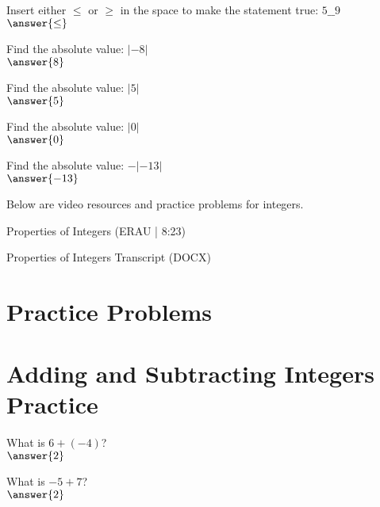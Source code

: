 \documentclass{ximera}
\begin{document}
\begin{problem}
Insert either $\leq$ or $\geq$ in the space to make the statement true: $5\_\_9$\\
$\answer{\leq}$
\end{problem}



\begin{problem}
Find the absolute value: $|-8|$\\
$\answer{8}$
\end{problem}

\begin{problem}
Find the absolute value: $|5|$\\
$\answer{5}$
\end{problem}

\begin{problem}
Find the absolute value: $|0|$\\
$\answer{0}$
\end{problem}

\begin{problem}
Find the absolute value: $-|-13|$\\
$\answer{-13}$
\end{problem}


Below are video resources and practice problems for integers.

Properties of Integers (ERAU | 8:23)


Properties of Integers Transcript (DOCX)

\section*{Practice Problems}


\section*{Adding and Subtracting Integers Practice}

\begin{problem}
What is $6 + (-4)$?\\
$\answer{2}$
\end{problem}

\begin{problem}
What is $-5 + 7$?\\
$\answer{2}$
\end{problem}
\end{document}

